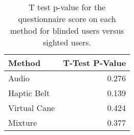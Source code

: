 
\begin{table}[!htb]
\centering
\caption{T test p-value for the questionnaire score on each method for blinded users versus sighted users.}
\label{tab:ttest_questionnaires}
\begin{tabular}{lr}
\toprule
      Method &  T-Test P-Value \\
\midrule
       Audio &           0.276 \\
 Haptic Belt &           0.139 \\
Virtual Cane &           0.424 \\
     Mixture &           0.377 \\
\bottomrule
\end{tabular}
\end{table}

